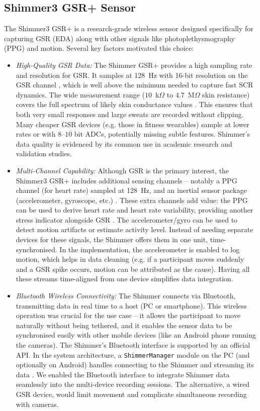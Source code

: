 \documentclass{report}
\begin{document}
\subsection*{Shimmer3 GSR+ Sensor}
The Shimmer3 GSR+ is a research-grade wireless sensor designed specifically for capturing GSR (EDA) along with other signals like photoplethysmography (PPG) and motion. Several key factors motivated this choice:
\begin{itemize}
	\item \textit{High-Quality GSR Data:} The Shimmer GSR+ provides a high sampling rate and resolution for GSR. It samples at 128~Hz with 16-bit resolution on the GSR channel \cite{shimmerdoc8}, which is well above the minimum needed to capture fast SCR dynamics. The wide measurement range ($10$~k$\Omega$ to $4.7$~M$\Omega$ skin resistance) covers the full spectrum of likely skin conductance values \cite{shimmerdoc8}. This ensures that both very small responses and large sweats are recorded without clipping. Many cheaper GSR devices (e.g. those in fitness wearables) sample at lower rates or with $8$--$10$ bit ADCs, potentially missing subtle features. Shimmer's data quality is evidenced by its common use in academic research and validation studies.

	\item \textit{Multi-Channel Capability:} Although GSR is the primary interest, the Shimmer3 GSR+ includes additional sensing channels -- notably a PPG channel (for heart rate) sampled at 128~Hz, and an inertial sensor package (accelerometer, gyroscope, etc.) \cite{shimmerapi15}. These extra channels add value: the PPG can be used to derive heart rate and heart rate variability, providing another stress indicator alongside GSR \cite{shimmerapi15}. The accelerometer/gyro can be used to detect motion artifacts or estimate activity level. Instead of needing separate devices for these signals, the Shimmer offers them in one unit, time-synchronised. In the implementation, the accelerometer is enabled to log motion, which helps in data cleaning (e.g. if a participant moves suddenly and a GSR spike occurs, motion can be attributed as the cause). Having all these streams time-aligned from one device simplifies data integration.

	\item \textit{Bluetooth Wireless Connectivity:} The Shimmer connects via Bluetooth, transmitting data in real time to a host (PC or smartphone). This wireless operation was crucial for the use case -- it allows the participant to move naturally without being tethered, and it enables the sensor data to be synchronised easily with other mobile devices (like an Android phone running the cameras). The Shimmer's Bluetooth interface is supported by an official API. In the system architecture, a \texttt{ShimmerManager} module on the PC (and optionally on Android) handles connecting to the Shimmer and streaming its data \cite{shimmerapi15}. We enabled the Bluetooth interface to integrate Shimmer data seamlessly into the multi-device recording sessions. The alternative, a wired GSR device, would limit movement and complicate simultaneous recording with cameras.


\end{itemize}
\end{document}
